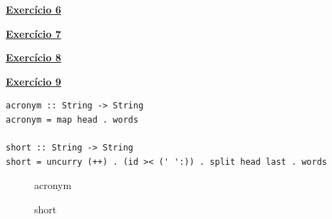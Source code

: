 \documentclass[a4paper,11pt]{article}
\begin{document}
	
	
	\noindent \underline{\textbf{Exercício 6}}
	
	
	
	\noindent \underline{\textbf{Exercício 7}}
	
	
	
	\noindent \underline{\textbf{Exercício 8}}
	
	
	
	\noindent \underline{\textbf{Exercício 9}}
	
\begin{verbatim}
acronym :: String -> String
acronym = map head . words

short :: String -> String
short = uncurry (++) . (id >< (' ':)) . split head last . words
\end{verbatim}

\begin{figure}[H]
	\centering
	\caption{acronym}
\end{figure}
	
\begin{figure}[H]
	\centering
	\caption{short}
\end{figure}

	
\end{document}
